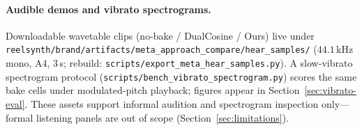 
\paragraph{Audible demos and vibrato spectrograms.}
Downloadable wavetable clips (no-bake / DualCosine / Ours) live under
\texttt{reelsynth/brand/artifacts/meta\_approach\_compare/hear\_samples/}
($44.1$\,kHz mono, A4, $3$\,s; rebuild: \texttt{scripts/export\_meta\_hear\_samples.py}).
A slow-vibrato spectrogram protocol (\texttt{scripts/bench\_vibrato\_spectrogram.py})
scores the same bake cells under modulated-pitch playback; figures appear in Section~\ref{sec:vibrato-eval}.
These assets support informal audition and spectrogram inspection only---formal listening panels are out of scope (Section~\ref{sec:limitations}).
